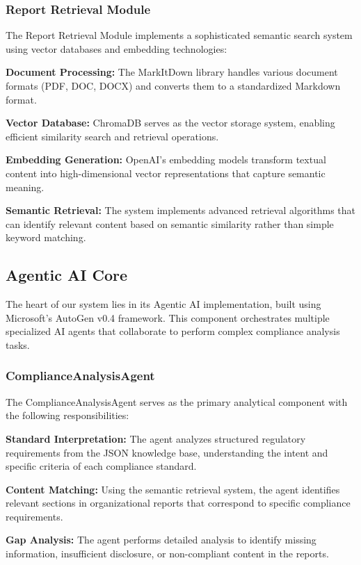 \documentclass[conference]{IEEEtran}
\begin{document}
\subsubsection{Report Retrieval Module}
The Report Retrieval Module implements a sophisticated semantic search system using vector databases and embedding technologies:

\textbf{Document Processing:} The MarkItDown library handles various document formats (PDF, DOC, DOCX) and converts them to a standardized Markdown format.

\textbf{Vector Database:} ChromaDB serves as the vector storage system, enabling efficient similarity search and retrieval operations.

\textbf{Embedding Generation:} OpenAI's embedding models transform textual content into high-dimensional vector representations that capture semantic meaning.

\textbf{Semantic Retrieval:} The system implements advanced retrieval algorithms that can identify relevant content based on semantic similarity rather than simple keyword matching.

\subsection{Agentic AI Core}

The heart of our system lies in its Agentic AI implementation, built using Microsoft's AutoGen v0.4 framework. This component orchestrates multiple specialized AI agents that collaborate to perform complex compliance analysis tasks.

\subsubsection{ComplianceAnalysisAgent}
The ComplianceAnalysisAgent serves as the primary analytical component with the following responsibilities:

\textbf{Standard Interpretation:} The agent analyzes structured regulatory requirements from the JSON knowledge base, understanding the intent and specific criteria of each compliance standard.

\textbf{Content Matching:} Using the semantic retrieval system, the agent identifies relevant sections in organizational reports that correspond to specific compliance requirements.

\textbf{Gap Analysis:} The agent performs detailed analysis to identify missing information, insufficient disclosure, or non-compliant content in the reports.
\end{document}
